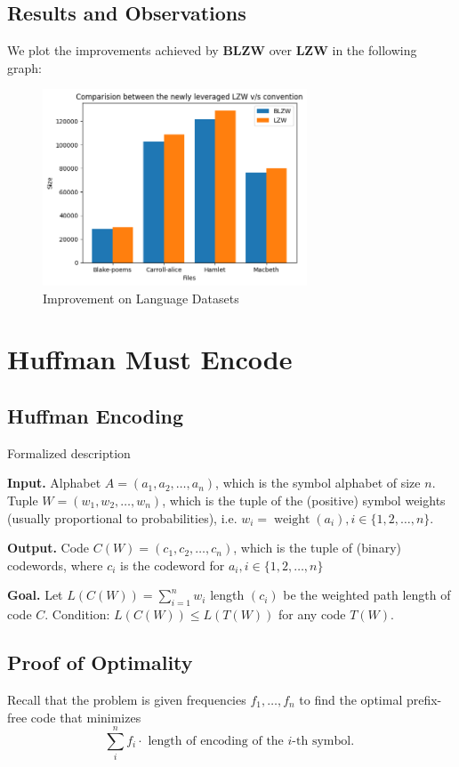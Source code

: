 \documentclass[scrartcl]{article}
\begin{document}
\subsection{Results and Observations}
We plot the improvements achieved by $\textbf{BLZW}$ over $\textbf{LZW}$ in the following graph:
\begin{figure}[H]
    \centering
    \includegraphics[width=0.7\textwidth]{blzwvslzw.png}
    \caption{Improvement on Language Datasets}
    \label{fig:example}
\end{figure}
\section{Huffman Must Encode}
\subsection{Huffman Encoding}
Formalized description 

\textbf{Input.}
Alphabet $A=\left(a_1, a_2, \ldots, a_n\right)$, which is the symbol alphabet of size $n$.
Tuple $W=\left(w_1, w_2, \ldots, w_n\right)$, which is the tuple of the (positive) symbol weights (usually proportional to probabilities), i.e. $w_i=\operatorname{weight}\left(a_i\right), i \in\{1,2, \ldots, n\}$.

\textbf{Output.}
Code $C(W)=\left(c_1, c_2, \ldots, c_n\right)$, which is the tuple of (binary) codewords, where $c_i$ is the codeword for $a_i, i \in\{1,2, \ldots, n\}$

\textbf{Goal.}
Let $L(C(W))=\sum_{i=1}^n w_i$ length $\left(c_i\right)$ be the weighted path length of code $C$. Condition: $L(C(W)) \leq L(T(W))$ for any code $T(W)$.

\subsection{Proof of Optimality}
Recall that the problem is given frequencies $f_1, \ldots, f_n$ to find the optimal prefix-free code that minimizes
$$
\sum_i^n f_i \cdot \text { length of encoding of the } i \text {-th symbol. }
$$
\end{document}
